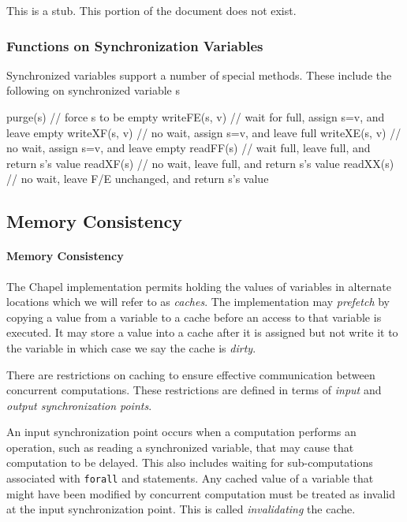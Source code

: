 This is a stub.  This portion of the document does not exist.

\subsubsection{Functions on Synchronization Variables}
\label{Functions_on_Synchronization_Variables}

Synchronized variables support a number of special methods. These
include the following on synchronized variable s
\begin{chapel}
purge(s)      // force s to be empty
writeFE(s, v) // wait for full, assign s=v, and leave empty
writeXF(s, v) // no wait, assign s=v, and leave full
writeXE(s, v) // no wait, assign s=v, and leave empty
readFF(s)     // wait full, leave full, and return s's value
readXF(s)     // no wait, leave full, and return s's value
readXX(s)     // no wait, leave F/E unchanged, and return s's value
\end{chapel}

\subsection{Memory Consistency}
\label{Memory_Consistency}

\paragraph{Memory Consistency}
The Chapel implementation permits holding the values of variables in
alternate locations which we will refer to as {\em caches}.  The
implementation may {\em prefetch} by copying a value from a variable
to a cache before an access to that variable is executed. It may store
a value into a cache after it is assigned but not write it to the
variable in which case we say the cache is {\em dirty}.
 
There are restrictions on caching to ensure effective communication
between concurrent computations. These restrictions are defined in
terms of {\em input} and {\em output synchronization points}.

An input synchronization point occurs when a computation performs an
operation, such as reading a synchronized variable, that may cause
that computation to be delayed. This also includes waiting for
sub-computations associated with {\tt forall} and 
statements. Any cached value of a variable that might have been
modified by concurrent computation must be treated as invalid at the
input synchronization point.  This is called {\em invalidating} the
cache.

